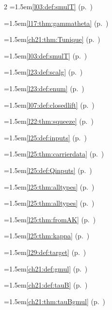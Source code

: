 \begin{multicols}{2}
\hangindent=1.5em\quad \ref{l03:def:smulT} (p.~\pageref{l03:def:smulT})\par
\hangindent=1.5em\quad \ref{l17:thm:gammatheta} (p.~\pageref{l17:thm:gammatheta})\par
\hangindent=1.5em\quad \ref{ch21:thm:Tunique} (p.~\pageref{ch21:thm:Tunique})\par
\hangindent=1.5em\quad \ref{l03:def:smulT} (p.~\pageref{l03:def:smulT})\par
\hangindent=1.5em\quad \ref{l23:def:scalg} (p.~\pageref{l23:def:scalg})\par
\hangindent=1.5em\quad \ref{l23:def:enum} (p.~\pageref{l23:def:enum})\par
\hangindent=1.5em\quad \ref{l07:def:closedlift} (p.~\pageref{l07:def:closedlift})\par
\hangindent=1.5em\quad \ref{l22:thm:squeeze} (p.~\pageref{l22:thm:squeeze})\par
\hangindent=1.5em\quad \ref{l25:def:inputs} (p.~\pageref{l25:def:inputs})\par
\hangindent=1.5em\quad \ref{l25:thm:carrierdata} (p.~\pageref{l25:thm:carrierdata})\par
\hangindent=1.5em\quad \ref{l25:def:Qinputs} (p.~\pageref{l25:def:Qinputs})\par
\hangindent=1.5em\quad \ref{l25:thm:alltypes} (p.~\pageref{l25:thm:alltypes})\par
\hangindent=1.5em\quad \ref{l25:thm:alltypes} (p.~\pageref{l25:thm:alltypes})\par
\hangindent=1.5em\quad \ref{l25:thm:fromAK} (p.~\pageref{l25:thm:fromAK})\par
\hangindent=1.5em\quad \ref{l25:thm:kappa} (p.~\pageref{l25:thm:kappa})\par
\hangindent=1.5em\quad \ref{l29:def:target} (p.~\pageref{l29:def:target})\par
\hangindent=1.5em\quad \ref{ch21:def:gmul} (p.~\pageref{ch21:def:gmul})\par
\hangindent=1.5em\quad \ref{ch21:def:tauB} (p.~\pageref{ch21:def:tauB})\par
\hangindent=1.5em\quad \ref{ch21:thm:tauBgmul} (p.~\pageref{ch21:thm:tauBgmul})\par

\end{multicols}
